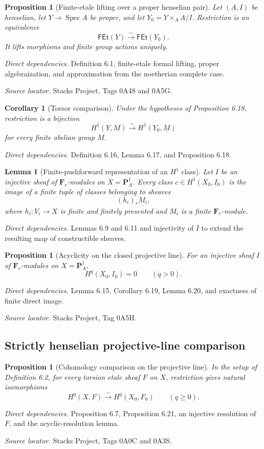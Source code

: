 \documentclass[10pt]{article}
\newtheorem{proposition}[theorem]{Proposition}
\newtheorem{lemma}[theorem]{Lemma}
\newtheorem{corollary}[theorem]{Corollary}
\theoremstyle{definition}
\newcommand{\Spec}{\operatorname{Spec}}
\newcommand{\F}{\mathbf F}
\newcommand{\deps}[1]{\par\smallskip\textit{Direct dependencies.} #1\par}
\newcommand{\sources}[1]{\par\textit{Source locator.} #1\par}
\begin{document}
\begin{proposition}[Finite-etale lifting over a proper henselian pair]
Let $(A,I)$ be henselian, let $Y\to\Spec A$ be proper, and let
$Y_0=Y\times_AA/I$.  Restriction is an equivalence
\[
 \mathsf{FEt}(Y)\xrightarrow{\sim}\mathsf{FEt}(Y_0).
\]
It lifts morphisms and finite group actions uniquely.
\end{proposition}
\deps{Definition 6.1, finite-etale formal lifting, proper algebraization,
and approximation from the noetherian complete case.}
\sources{Stacks Project, Tags 0A48 and 0A5G.}

\begin{corollary}[Torsor comparison]
Under the hypotheses of Proposition 6.18, restriction is a bijection
\[
 H^1(Y,\underline M)\xrightarrow{\sim}H^1(Y_0,\underline M)
\]
for every finite abelian group $M$.
\end{corollary}
\deps{Definition 6.16, Lemma 6.17, and Proposition 6.18.}

\begin{lemma}[Finite-pushforward representation of an $H^1$ class]
Let $I$ be an injective sheaf of $\F_r$-modules on
$X=\mathbf P^1_A$.  Every class $c\in H^1(X_0,I_0)$ is the image of a
finite tuple of classes belonging to sheaves
\[
 (h_i)_*\underline{M_i},
\]
where $h_i:V_i\to X$ is finite and finitely presented and $M_i$ is a
finite $\F_r$-module.
\end{lemma}
\deps{Lemmas 6.9 and 6.11 and injectivity of $I$ to extend the resulting
map of constructible sheaves.}

\begin{proposition}[Acyclicity on the closed projective line]
For an injective sheaf $I$ of $\F_r$-modules on
$X=\mathbf P^1_A$,
\[
 H^q(X_0,I_0)=0\qquad(q>0).
\]
\end{proposition}
\deps{Lemma 6.15, Corollary 6.19, Lemma 6.20, and exactness of finite
direct image.}
\sources{Stacks Project, Tag 0A5H.}

\subsection{Strictly henselian projective-line comparison}

\begin{proposition}[Cohomology comparison on the projective line]
In the setup of Definition 6.2, for every torsion etale sheaf $F$ on $X$,
restriction gives natural isomorphisms
\[
 H^q(X,F)\xrightarrow{\sim}H^q(X_0,F_0)
 \qquad(q\geq0).
\]
\end{proposition}
\deps{Proposition 6.7, Proposition 6.21, an injective resolution of $F$,
and the acyclic-resolution lemma.}
\sources{Stacks Project, Tags 0A0C and 0A3S.}
\end{document}
